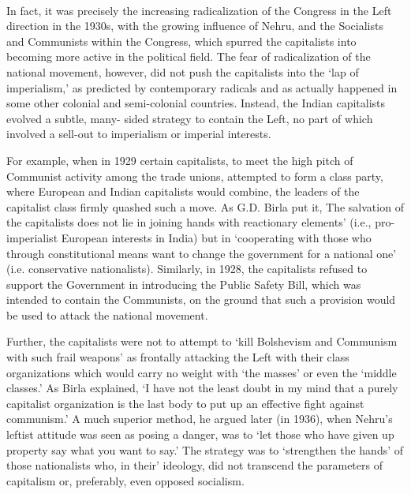 \paragraph*{}


In fact, it was precisely the increasing radicalization of the Congress in the Left direction in the 1930s, with the growing influence of Nehru, and the Socialists and Communists within the Congress, which spurred the capitalists into becoming more active in the political field. The fear of radicalization of the national movement, however, did not push the capitalists into the `lap of imperialism,' as predicted by contemporary radicals and as actually happened in some other colonial and semi-colonial countries. Instead, the Indian capitalists evolved a subtle, many- sided strategy to contain the Left, no part of which involved a sell-out to imperialism or imperial interests. 

For example, when in 1929 certain capitalists, to meet the high pitch of Communist activity among the trade unions, attempted to form a class party, where European and Indian capitalists would combine, the leaders of the capitalist class firmly quashed such a move. As G.D. Birla put it, The salvation of the capitalists does not lie in joining hands with reactionary elements' (i.e., pro-imperialist European interests in India) but in `cooperating with those who through constitutional means want to change the government for a national one' (i.e. conservative nationalists). Similarly, in 1928, the capitalists refused to support the Government in introducing the Public Safety Bill, which was intended to contain the Communists, on the ground that such a provision would be used to attack the national movement. 

Further, the capitalists were not to attempt to `kill Bolshevism and Communism with such frail weapons' as frontally attacking the Left with their class organizations which would carry no weight with `the masses' or even the `middle classes.' As Birla explained, `I have not the least doubt in my mind that a purely capitalist organization is the last body to put up an effective fight against communism.' A much superior method, he argued later (in 1936), when Nehru's leftist attitude was seen as posing a danger, was to `let those who have given up property say what you want to say.' The strategy was to `strengthen the hands' of those nationalists who, in their' ideology, did not transcend the parameters of capitalism or, preferably, even opposed socialism. 

